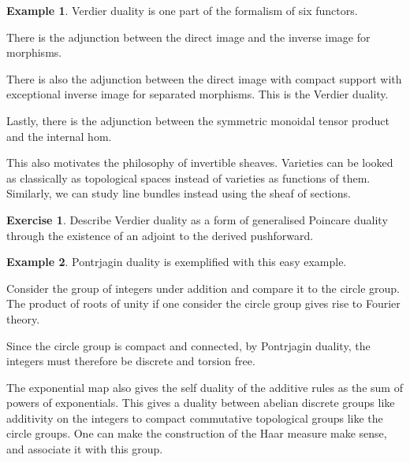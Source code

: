 \documentclass[10pt]{article}
\theoremstyle{plain}%
\theoremstyle{definition}
\newtheorem{example}{Example}[section]
\newtheorem{exercise}{Exercise}[section]
\theoremstyle{remark}
\begin{document}
\begin{example}
	Verdier duality is one part of the formalism of six functors.

	There is the adjunction between the direct image and the inverse image for morphisms.

	There is also the adjunction between the direct image with compact support with exceptional inverse image for separated morphisms. This is the Verdier duality.

	Lastly, there is the adjunction between the symmetric monoidal tensor product and the internal hom.

	This also motivates the philosophy of invertible sheaves. Varieties can be looked as classically as topological spaces instead of varieties as functions of them. Similarly, we can study line bundles instead using the sheaf of sections.
\end{example}

\begin{exercise}
	Describe Verdier duality as a form of generalised Poincare duality through the existence of an adjoint to the derived pushforward.
\end{exercise}

\begin{example}
	Pontrjagin duality is exemplified with this easy example.

	Consider the group of integers under addition and compare it to the circle group. The product of roots of unity if one consider the circle group gives rise to Fourier theory.

	Since the circle group is compact and connected, by Pontrjagin duality, the integers must therefore be discrete and torsion free.

	The exponential map also gives the self duality of the additive rules as the sum of powers of exponentials. This gives a duality between abelian discrete groups like additivity on the integers to compact commutative topological groups like the circle groups. One can make the construction of the Haar measure make sense, and associate it with this group.
\end{example}
\end{document}
